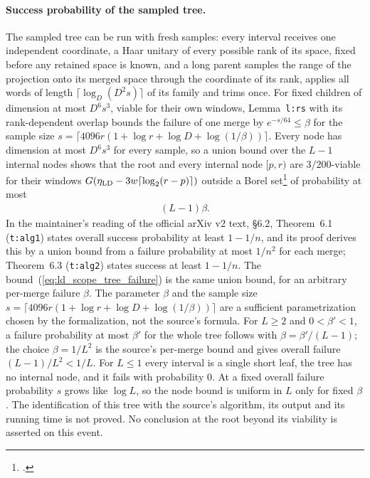\documentclass{article}
\begin{document}
\paragraph{Success probability of the sampled tree.}
The sampled tree can be run with fresh samples: every interval receives one
independent coordinate, a Haar unitary of every possible rank of its space,
fixed before any retained space is known, and a long parent samples the
range of the projection onto its merged space through the coordinate of its
rank, applies all words of length $\lceil\log_D(D^2s)\rceil$ of its family
and trims once. For fixed children of dimension at most $D^6s^3$, viable for
their own windows, Lemma~\texttt{l:rs} with its rank-dependent overlap
bounds the failure of one merge by $e^{-s/64}\le\beta$ for the sample size
$s=\lceil4096r(1+\log r+\log D+\log(1/\beta))\rceil$. Every node has
dimension at most $D^6s^3$ for every sample, so a union bound over the $L-1$
internal nodes shows that the root and every internal node $[p,r)$ are
$3/200$-viable for their windows $G(\eta_{\rm LD}-3w\lceil\log_2(r-p)\rceil)$
outside a Borel
set\footnote{.}
of probability at most
\begin{align}
    (L-1)\beta.
    \label{eq:ld_scope_tree_failure}
\end{align}
In the maintainer's reading of the official arXiv v2 text, \S6.2,
Theorem~6.1 (\texttt{t:alg1}) states overall success probability at least
$1-1/n$, and its proof derives this by a union bound from a failure
probability at most $1/n^2$ for each merge; Theorem~6.3 (\texttt{t:alg2}) states success at least $1-1/n$. The
bound~(\ref{eq:ld_scope_tree_failure}) is the same union bound, for an arbitrary per-merge
failure $\beta$. The parameter $\beta$ and the sample size
$s=\lceil4096 r(1+\log r+\log D+\log(1/\beta))\rceil$ are a sufficient
parametrization chosen by the formalization, not the source's formula.
For $L\ge2$ and $0<\beta'<1$, a failure probability at most $\beta'$ for the
whole tree follows with $\beta=\beta'/(L-1)$; the choice $\beta=1/L^2$ is
the source's per-merge bound and gives overall failure $(L-1)/L^2<1/L$.
For $L\le1$ every interval is a single short leaf, the tree has no internal
node, and it fails with probability $0$. At a fixed overall failure
probability $s$ grows like $\log L$, so the node bound is uniform in $L$
only for fixed $\beta$. The identification of this tree with the source's
algorithm, its output and its running time is not proved.
No conclusion at the root beyond its viability is asserted on this event.
\end{document}
